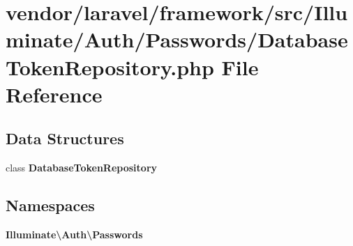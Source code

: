 \section{vendor/laravel/framework/src/\+Illuminate/\+Auth/\+Passwords/\+Database\+Token\+Repository.php File Reference}
\label{_database_token_repository_8php}
\subsection*{Data Structures}
\begin{DoxyCompactItemize}
\item 
class {\bf Database\+Token\+Repository}
\end{DoxyCompactItemize}
\subsection*{Namespaces}
\begin{DoxyCompactItemize}
\item 
 {\bf Illuminate\textbackslash{}\+Auth\textbackslash{}\+Passwords}
\end{DoxyCompactItemize}
